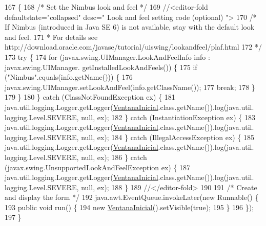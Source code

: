 \begin{DoxyCode}
167                                            \{
168         \textcolor{comment}{/* Set the Nimbus look and feel */}
169         \textcolor{comment}{//<editor-fold defaultstate="collapsed" desc=" Look and feel setting code (optional) ">}
170         \textcolor{comment}{/* If Nimbus (introduced in Java SE 6) is not available, stay with the default look and feel.}
171 \textcolor{comment}{         * For details see http://download.oracle.com/javase/tutorial/uiswing/lookandfeel/plaf.html }
172 \textcolor{comment}{         */}
173         \textcolor{keywordflow}{try} \{
174             \textcolor{keywordflow}{for} (javax.swing.UIManager.LookAndFeelInfo info : javax.swing.UIManager.
      getInstalledLookAndFeels()) \{
175                 \textcolor{keywordflow}{if} (\textcolor{stringliteral}{"Nimbus"}.equals(info.getName())) \{
176                     javax.swing.UIManager.setLookAndFeel(info.getClassName());
177                     \textcolor{keywordflow}{break};
178                 \}
179             \}
180         \} \textcolor{keywordflow}{catch} (ClassNotFoundException ex) \{
181             java.util.logging.Logger.getLogger(\mbox{\hyperlink{class_interfaz_1_1_ventana_inicial_a9e19b8b8cd08845d7b65b8f5f8b99d1e}{VentanaInicial}}.class.getName()).log(java.util.
      logging.Level.SEVERE, null, ex);
182         \} \textcolor{keywordflow}{catch} (InstantiationException ex) \{
183             java.util.logging.Logger.getLogger(\mbox{\hyperlink{class_interfaz_1_1_ventana_inicial_a9e19b8b8cd08845d7b65b8f5f8b99d1e}{VentanaInicial}}.class.getName()).log(java.util.
      logging.Level.SEVERE, null, ex);
184         \} \textcolor{keywordflow}{catch} (IllegalAccessException ex) \{
185             java.util.logging.Logger.getLogger(\mbox{\hyperlink{class_interfaz_1_1_ventana_inicial_a9e19b8b8cd08845d7b65b8f5f8b99d1e}{VentanaInicial}}.class.getName()).log(java.util.
      logging.Level.SEVERE, null, ex);
186         \} \textcolor{keywordflow}{catch} (javax.swing.UnsupportedLookAndFeelException ex) \{
187             java.util.logging.Logger.getLogger(\mbox{\hyperlink{class_interfaz_1_1_ventana_inicial_a9e19b8b8cd08845d7b65b8f5f8b99d1e}{VentanaInicial}}.class.getName()).log(java.util.
      logging.Level.SEVERE, null, ex);
188         \}
189         \textcolor{comment}{//</editor-fold>}
190 
191         \textcolor{comment}{/* Create and display the form */}
192         java.awt.EventQueue.invokeLater(\textcolor{keyword}{new} Runnable() \{
193             \textcolor{keyword}{public} \textcolor{keywordtype}{void} run() \{
194                 \textcolor{keyword}{new} \mbox{\hyperlink{class_interfaz_1_1_ventana_inicial_a9e19b8b8cd08845d7b65b8f5f8b99d1e}{VentanaInicial}}().setVisible(\textcolor{keyword}{true});
195             \}
196         \});
197     \}
\end{DoxyCode}


